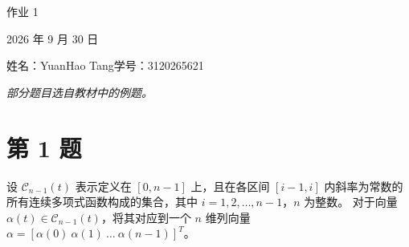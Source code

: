 \documentclass[UTF8,10pt,letterpaper,fontset=fandol]{ctexart}
\begin{document}
\begin{center}
{\LARGE 作业 1}\par
\vspace{0.6em}
2026 年 9 月 30 日\par
姓名：YuanHao Tang\quad 学号：3120265621
\end{center}
\begin{center}
\emph{部分题目选自教材中的例题。}
\end{center}

\section{第 1 题}
设 \(\mathcal C_{n-1}(t)\) 表示定义在 \([0,n-1]\) 上，且在各区间
\([i-1,i]\) 内斜率为常数的所有连续多项式函数构成的集合，其中
\(i=1,2,\ldots,n-1\)，\(n\) 为整数。
对于向量 \(\alpha(t)\in\mathcal C_{n-1}(t)\)，将其对应到一个
\(n\) 维列向量 \(\alpha=[\alpha(0)\ \alpha(1)\ \ldots\ \alpha(n-1)]^T\)。
\end{document}
